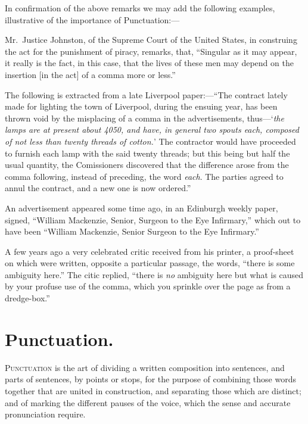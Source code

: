 In confirmation of the above remarks we may add the following examples,
illustrative of the importance of Punctuation:---

\begin{example}
    Mr.\ Justice Johnston, of the Supreme Court of the United States, in
    construing the act for the punishment of piracy, remarks, that, ``Singular
    as it may appear, it really is the fact, in this case, that the lives of
    these men may depend on the insertion [in the act] of a comma more or
    less.''

    The following is extracted from a late Liverpool paper:---``The contract
    lately made for lighting the town of Liverpool, during the ensuing year, has
    been thrown void by the misplacing of a comma in the advertisements,
    thus---`{\em{}the lamps are at present about 4050, and have, in general two
    spouts each, composed of not less than twenty threads of cotton.}' The
    contractor would have proceeded to furnish each lamp with the said twenty
    threads; but this being but half the usual quantity, the Comissioners
    discovered that the difference arose from the comma following, instead of
    preceding, the word \emph{each}. The parties agreed to annul the contract,
    and a new one is now ordered.''

    An advertisement appeared some time ago, in an Edinburgh weekly paper,
    signed, ``William Mackenzie, Senior, Surgeon to the Eye Infirmary,'' which
    out to have been ``William Mackenzie, Senior Surgeon to the Eye Infirmary.''

    A few years ago a very celebrated critic received from his printer, a
    proof-sheet on which were written, opposite a particular passage, the words,
    ``there is some ambiguity here.'' The citic replied, ``there is \emph{no}
    ambiguity here but what is caused by your profuse use of the comma, which
    you sprinkle over the page as from a dredge-box.''
\end{example}

\section{Punctuation.}
\textsc{Punctuation} is the art of dividing a written composition into
sentences, and parts of sentences, by points or stops, for the purpose of
combining those words together that are united in construction, and separating
those which are distinct; and of marking the different pauses of the voice,
which the sense and accurate pronunciation require.


